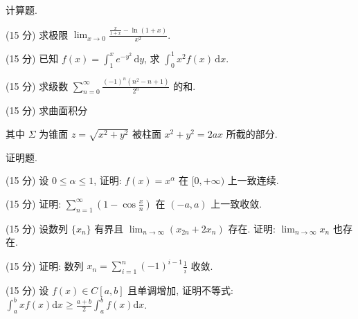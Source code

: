 \par{}
计算题.\par
(15 分) 求极限 $\lim_{x\to 0}\frac{\frac{x}{1 + x} - \ln(1 + x)}{x^2}$.\par
(15 分) 已知 $f(x) = \int_{1}^{x} e^{-y^2} \, \mathrm{d}y$, 求 $\int_{0}^{1} x^2 f(x) \, \mathrm{d}x$.\par
(15 分) 求级数 $\sum_{n=0}^{\infty} \frac{(-1)^n (n^2 - n + 1)}{2^n}$ 的和.\par
\par{}
(15 分) 求曲面积分\par
\nopagebreak[4]
其中  $\Sigma$  为锥面  $z = \sqrt{x^{2} + y^{2}}$  被柱面  $x^{2} + y^{2} = 2ax$  所截的部分.\par
\par{}
证明题.\par
(15 分) 设 $0 \leq \alpha \leq 1$, 证明: $f(x) = x^{\alpha}$ 在 $[0, +\infty)$ 上一致连续.\par
(15 分) 证明: $\sum_{n=1}^{\infty}\left(1 - \cos\frac{x}{n}\right)$ 在 $(-a, a)$ 上一致收敛.\par
(15 分) 设数列 $\{x_{n}\}$ 有界且 $\lim_{n\to \infty}(x_{2n} + 2x_n)$ 存在. 证明: $\lim_{n\to \infty}x_n$ 也存在.\par
(15 分) 证明: 数列 $x_{n} = \sum_{i=1}^{n} (-1)^{i-1} \frac{1}{i}$ 收敛.\par
(15 分) 设 $f(x) \in C[a, b]$ 且单调增加, 证明不等式: $\int_{a}^{b} x f(x) \mathrm{d}x \geq \frac{a + b}{2} \int_{a}^{b} f(x) \mathrm{d}x$.\par
